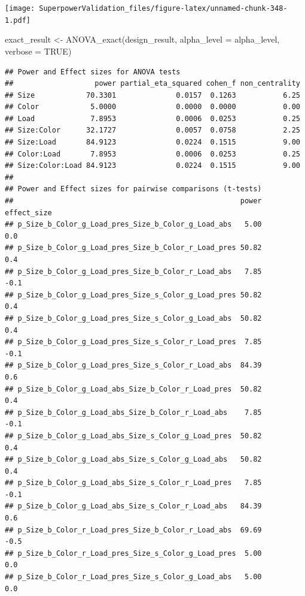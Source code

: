 \documentclass[
]{book}
\newenvironment{Shaded}{\begin{snugshade}}{\end{snugshade}}
\newcommand{\AttributeTok}[1]{\textcolor[rgb]{0.77,0.63,0.00}{#1}}
\newcommand{\ConstantTok}[1]{\textcolor[rgb]{0.00,0.00,0.00}{#1}}
\newcommand{\FunctionTok}[1]{\textcolor[rgb]{0.00,0.00,0.00}{#1}}
\newcommand{\NormalTok}[1]{#1}
\newcommand{\OtherTok}[1]{\textcolor[rgb]{0.56,0.35,0.01}{#1}}
\begin{document}
\texttt{[image: SuperpowerValidation\_files/figure-latex/unnamed-chunk-348-1.pdf]}

\begin{Shaded}
\begin{Highlighting}[]
\NormalTok{exact\_result }\OtherTok{\textless{}{-}} \FunctionTok{ANOVA\_exact}\NormalTok{(design\_result,}
                            \AttributeTok{alpha\_level =}\NormalTok{ alpha\_level,}
                            \AttributeTok{verbose =} \ConstantTok{TRUE}\NormalTok{)}
\end{Highlighting}
\end{Shaded}

\begin{verbatim}
## Power and Effect sizes for ANOVA tests
##                   power partial_eta_squared cohen_f non_centrality
## Size            70.3301              0.0157  0.1263           6.25
## Color            5.0000              0.0000  0.0000           0.00
## Load             7.8953              0.0006  0.0253           0.25
## Size:Color      32.1727              0.0057  0.0758           2.25
## Size:Load       84.9123              0.0224  0.1515           9.00
## Color:Load       7.8953              0.0006  0.0253           0.25
## Size:Color:Load 84.9123              0.0224  0.1515           9.00
## 
## Power and Effect sizes for pairwise comparisons (t-tests)
##                                                     power effect_size
## p_Size_b_Color_g_Load_pres_Size_b_Color_g_Load_abs   5.00         0.0
## p_Size_b_Color_g_Load_pres_Size_b_Color_r_Load_pres 50.82         0.4
## p_Size_b_Color_g_Load_pres_Size_b_Color_r_Load_abs   7.85        -0.1
## p_Size_b_Color_g_Load_pres_Size_s_Color_g_Load_pres 50.82         0.4
## p_Size_b_Color_g_Load_pres_Size_s_Color_g_Load_abs  50.82         0.4
## p_Size_b_Color_g_Load_pres_Size_s_Color_r_Load_pres  7.85        -0.1
## p_Size_b_Color_g_Load_pres_Size_s_Color_r_Load_abs  84.39         0.6
## p_Size_b_Color_g_Load_abs_Size_b_Color_r_Load_pres  50.82         0.4
## p_Size_b_Color_g_Load_abs_Size_b_Color_r_Load_abs    7.85        -0.1
## p_Size_b_Color_g_Load_abs_Size_s_Color_g_Load_pres  50.82         0.4
## p_Size_b_Color_g_Load_abs_Size_s_Color_g_Load_abs   50.82         0.4
## p_Size_b_Color_g_Load_abs_Size_s_Color_r_Load_pres   7.85        -0.1
## p_Size_b_Color_g_Load_abs_Size_s_Color_r_Load_abs   84.39         0.6
## p_Size_b_Color_r_Load_pres_Size_b_Color_r_Load_abs  69.69        -0.5
## p_Size_b_Color_r_Load_pres_Size_s_Color_g_Load_pres  5.00         0.0
## p_Size_b_Color_r_Load_pres_Size_s_Color_g_Load_abs   5.00         0.0

\end{verbatim}
\end{document}
